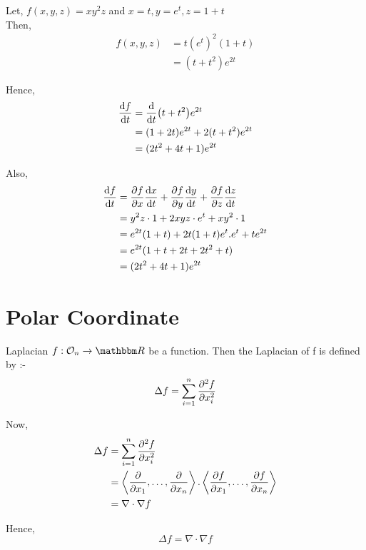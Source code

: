 \documentclass[../Analysis-3]{subfiles}
\begin{document}
\begin{Eg}{}{}
	Let, $f(x,y,z) = xy^{2}z$ and $x=t, y=e^t, z= 1+t$ \\
	Then, \begin{align*}
		f(x,y,z) & = t(e^t)^2(1+t) \\
		         & = (t+t^2)e^{2t}
	\end{align*}

	Hence, \begin{align*}
		\dv{f}{t} & = \dv{t}(t+t^2)e^{2t}           \\
		          & = (1+2t)e^{2t} + 2(t+t^2)e^{2t} \\
		          & = (2t^2+4t+1)e^{2t}
	\end{align*}

	Also, \begin{align*}
		\dv{f}{t} & = \pdv{f}{x} \dv{x}{t} + \pdv{f}{y} \dv{y}{t} + \pdv{f}{z} \dv{z}{t} \\
		          & = y^2z\cdot 1 + 2xyz\cdot e^t + xy^2\cdot 1                          \\
		          & = e^{2t}(1+t) + 2t(1+t)e^t.e^t + te^{2t}                             \\
		          & = e^{2t}(1+t+2t+2t^2+t)                                              \\
		          & = (2t^2+4t+1)e^{2t}
	\end{align*}
\end{Eg}


\section{Polar Coordinate}

\begin{Def}{Laplacian}{}
	$f : \Op{n} \to \R$ be a function. Then the Laplacian of f is defined by :- \[ \Delta f = \sum_{i = 1}^{n} \pdv[2]{f}{x_i}   \]
\end{Def}

Now, \begin{align*}
	\Delta f & = \sum_{i=1}^{n} \pdv[2]{f}{x_i}                                                                                               \\
	         & = \left\langle \pdv{}{x_1}, \ldots, \pdv{}{x_n}  \right\rangle. \left\langle \pdv{f}{x_1}, \ldots, \pdv{f}{x_n}  \right\rangle \\
	         & = \nabla\cdot\nabla f
\end{align*}

Hence, \[\boxed{\Delta f = \nabla\cdot\nabla f}\]
\end{document}

